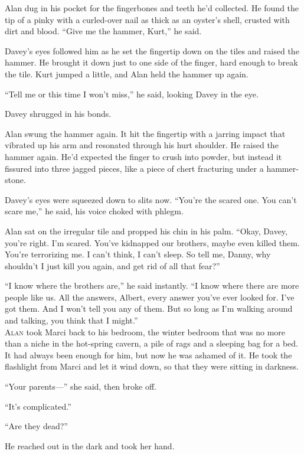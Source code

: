 Alan dug in his pocket for the fingerbones and teeth he'd collected. 
He found the tip of a pinky with a curled-over nail as thick as an
oyster's shell, crusted with dirt and blood.  ``Give me the hammer,
Kurt,'' he said.

Davey's eyes followed him as he set the fingertip down on the tiles
and raised the hammer.  He brought it down just to one side of the
finger, hard enough to break the tile.  Kurt jumped a little, and Alan
held the hammer up again.

``Tell me or this time I won't miss,'' he said, looking Davey in the
eye.

Davey shrugged in his bonds.

Alan swung the hammer again.  It hit the fingertip with a jarring
impact that vibrated up his arm and resonated through his hurt
shoulder.  He raised the hammer again.  He'd expected the finger to
crush into powder, but instead it fissured into three jagged pieces,
like a piece of chert fracturing under a hammer-stone.

Davey's eyes were squeezed down to slits now.  ``You're the scared
one.  You can't scare me,'' he said, his voice choked with phlegm.

Alan sat on the irregular tile and propped his chin in his palm. 
``Okay, Davey, you're right.  I'm scared.  You've kidnapped our
brothers, maybe even killed them.  You're terrorizing me.  I can't
think, I can't sleep.  So tell me, Danny, why shouldn't I just kill
you again, and get rid of all that fear?''

``I know where the brothers are,'' he said instantly.  ``I know where
there are more people like us.  All the answers, Albert, every answer
you've ever looked for.  I've got them.  And I won't tell you any of
them.  But so long as I'm walking around and talking, you think that I
might.''
\\
\lettrine[lines=3, lhang=.5, nindent=0pt, findent=2pt]{A}{lan} took Marci back to his bedroom, the winter bedroom that was no
more than a niche in the hot-spring cavern, a pile of rags and a
sleeping bag for a bed.  It had always been enough for him, but now he
was ashamed of it.  He took the flashlight from Marci and let it wind
down, so that they were sitting in darkness.

``Your parents---'' she said, then broke off.

``It's complicated.''

``Are they dead?''

He reached out in the dark and took her hand.

